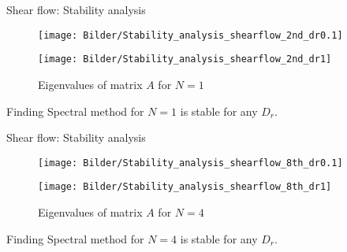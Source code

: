 \begin{frame}{Shear flow: Stability analysis}
	\begin{figure}
		\centering
		\begin{minipage}{0.4\linewidth}
			\texttt{[image: Bilder/Stability\_analysis\_shearflow\_2nd\_dr0.1]}
		\end{minipage}
		\hspace{1cm}
		\begin{minipage}{0.4\linewidth}
			\centering
			\texttt{[image: Bilder/Stability\_analysis\_shearflow\_2nd\_dr1]}
		\end{minipage}
		\caption{Eigenvalues of matrix $A$ for $N=1$}
	\end{figure}
	
	\begin{block}{Finding}
		Spectral method for $N=1$ is stable for any $D_r$.
	\end{block}
\end{frame}

\begin{frame}{Shear flow: Stability analysis}
	\begin{figure}
		\centering
		\begin{minipage}{0.4\linewidth}
			\texttt{[image: Bilder/Stability\_analysis\_shearflow\_8th\_dr0.1]}
		\end{minipage}
		\hspace{1cm}
		\begin{minipage}{0.4\linewidth}
			\centering
			\texttt{[image: Bilder/Stability\_analysis\_shearflow\_8th\_dr1]}
		\end{minipage}
		\caption{Eigenvalues of matrix $A$ for $N=4$}
	\end{figure}
	
	\begin{block}{Finding}
		Spectral method for $N=4$ is stable for any $D_r$.
	\end{block}
\end{frame}






